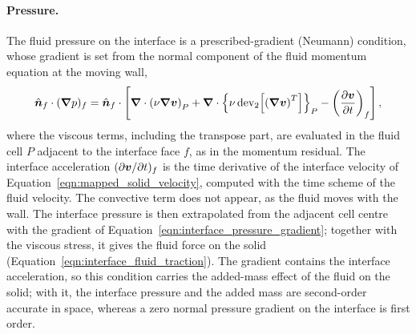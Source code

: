 \paragraph{Pressure.}
The fluid pressure on the interface is a prescribed-gradient (Neumann) condition, whose gradient is set from the normal component of the fluid momentum equation at the moving wall,
\begin{equation}
    \hat{\boldsymbol{n}}_f \cdot (\boldsymbol{\nabla} p)_f
    =
    \hat{\boldsymbol{n}}_f \cdot
    \left[
    \boldsymbol{\nabla}\cdot\left(\nu \boldsymbol{\nabla}\boldsymbol{v}\right)_{P}
    +
    \boldsymbol{\nabla}\cdot\left\{\nu\, \mathrm{dev}_2\!\left[\left(\boldsymbol{\nabla}\boldsymbol{v}\right)^{T}\right]\right\}_{P}
    -
    \left(\frac{\partial \boldsymbol{v}}{\partial t}\right)_f
    \right],
    \label{eqn:interface_pressure_gradient}
\end{equation}
where the viscous terms, including the transpose part, are evaluated in the fluid cell $P$ adjacent to the interface face $f$, as in the momentum residual.
The interface acceleration $(\partial\boldsymbol{v}/\partial t)_f$ is the time derivative of the interface velocity of Equation~\eqref{eqn:mapped_solid_velocity}, computed with the time scheme of the fluid velocity.
The convective term does not appear, as the fluid moves with the wall.
The interface pressure is then extrapolated from the adjacent cell centre with the gradient of Equation~\eqref{eqn:interface_pressure_gradient}; together with the viscous stress, it gives the fluid force on the solid (Equation~\eqref{eqn:interface_fluid_traction}).
The gradient contains the interface acceleration, so this condition carries the added-mass effect of the fluid on the solid; with it, the interface pressure and the added mass are second-order accurate in space, whereas a zero normal pressure gradient on the interface is first order.


